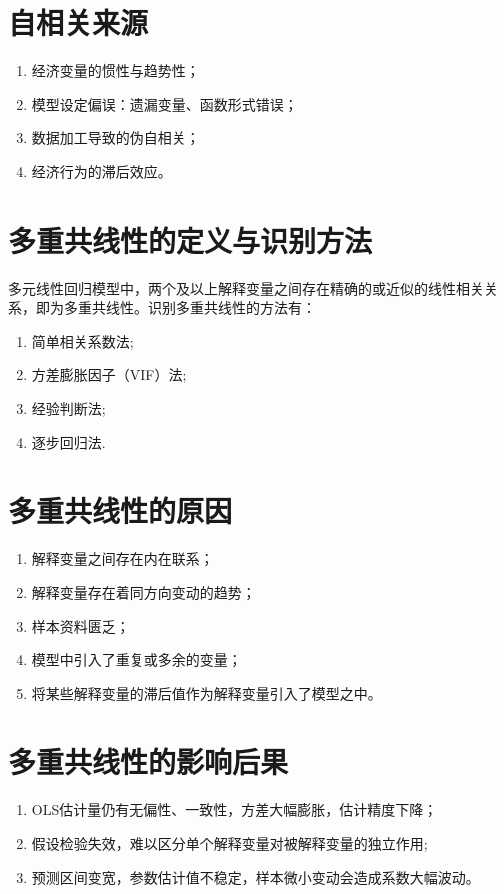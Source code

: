 \documentclass{ctexart}
\begin{document}
\section{自相关来源}
\begin{enumerate}
\item 经济变量的惯性与趋势性；
\item 模型设定偏误：遗漏变量、函数形式错误；
\item 数据加工导致的伪自相关；
\item 经济行为的滞后效应。
\end{enumerate}

\section{多重共线性的定义与识别方法}

多元线性回归模型中，两个及以上解释变量之间存在精确的或近似的线性相关关系，即为多重共线性。识别多重共线性的方法有：
\begin{enumerate}
\item 简单相关系数法;

\item 方差膨胀因子（VIF）法;

\item 经验判断法;

\item 逐步回归法.
\end{enumerate}

\section{多重共线性的原因}
\begin{enumerate}
\item 解释变量之间存在内在联系；
\item 解释变量存在着同方向变动的趋势；
\item 样本资料匮乏；
\item 模型中引入了重复或多余的变量；
\item 将某些解释变量的滞后值作为解释变量引入了模型之中。
\end{enumerate}

\section{多重共线性的影响后果}
\begin{enumerate}
\item OLS估计量仍有无偏性、一致性，方差大幅膨胀，估计精度下降；
\item 假设检验失效，难以区分单个解释变量对被解释变量的独立作用;
\item 预测区间变宽，参数估计值不稳定，样本微小变动会造成系数大幅波动。
\end{enumerate}
\end{document}
